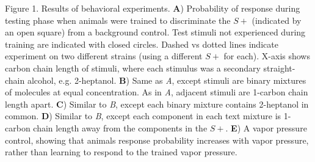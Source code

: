 Figure 1. Results of behavioral experiments. \textbf{A}) Probability of response during testing phase when animals were trained to discriminate the $S+$ (indicated by an open square) from a background control.  Test stimuli not experienced during training are indicated with closed circles.  Dashed vs dotted lines indicate experiment on two different strains (using a different $S+$ for each).  X-axis shows carbon chain length of stimuli, where each stimulus was a secondary straight-chain alcohol, e.g. 2-heptanol.  \textbf{B}) Same as \textit{A}, except stimuli are binary mixtures of molecules at equal concentration.  As in \textit{A}, adjacent stimuli are 1-carbon chain length apart. \textbf{C}) Similar to \textit{B}, except each binary mixture contains 2-heptanol in common. \textbf{D}) Similar to \textit{B}, except each component in each text mixture is 1-carbon chain length away from the components in the $S+$. \textbf{E}) A vapor pressure control, showing that animals response probability increases with vapor pressure, rather than learning to respond to the trained vapor pressure.  